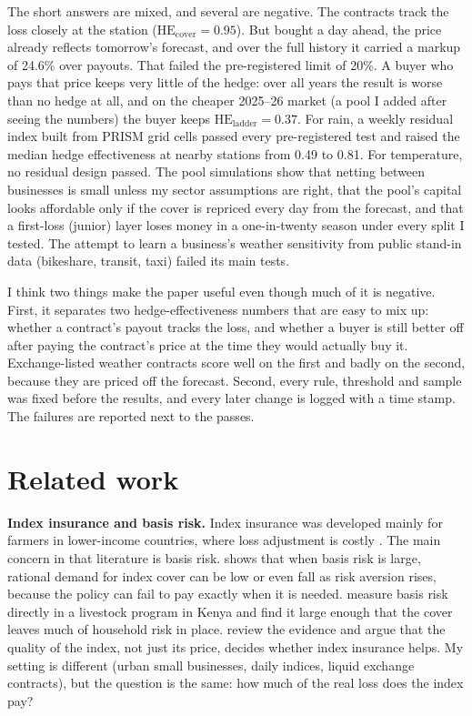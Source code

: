 \documentclass[11pt]{article}
\newcommand{\HEcov}{\mathrm{HE}_{\mathrm{cover}}}
\newcommand{\HElad}{\mathrm{HE}_{\mathrm{ladder}}}
\begin{document}
The short answers are mixed, and several are negative. The contracts track the loss closely at the station ($\HEcov = 0.95$). But bought a day ahead, the price already reflects tomorrow's forecast, and over the full history it carried a markup of 24.6\% over payouts. That failed the pre-registered limit of 20\%. A buyer who pays that price keeps very little of the hedge: over all years the result is worse than no hedge at all, and on the cheaper 2025--26 market (a pool I added after seeing the numbers) the buyer keeps $\HElad = 0.37$. For rain, a weekly residual index built from PRISM grid cells passed every pre-registered test and raised the median hedge effectiveness at nearby stations from 0.49 to 0.81. For temperature, no residual design passed. The pool simulations show that netting between businesses is small unless my sector assumptions are right, that the pool's capital looks affordable only if the cover is repriced every day from the forecast, and that a first-loss (junior) layer loses money in a one-in-twenty season under every split I tested. The attempt to learn a business's weather sensitivity from public stand-in data (bikeshare, transit, taxi) failed its main tests.

I think two things make the paper useful even though much of it is negative. First, it separates two hedge-effectiveness numbers that are easy to mix up: whether a contract's payout tracks the loss, and whether a buyer is still better off after paying the contract's price at the time they would actually buy it. Exchange-listed weather contracts score well on the first and badly on the second, because they are priced off the forecast. Second, every rule, threshold and sample was fixed before the results, and every later change is logged with a time stamp. The failures are reported next to the passes.

\section{Related work}
\label{sec:related}

\textbf{Index insurance and basis risk.} Index insurance was developed mainly for farmers in lower-income countries, where loss adjustment is costly \citep{barnett2007}. The main concern in that literature is basis risk. \citet{clarke2016} shows that when basis risk is large, rational demand for index cover can be low or even fall as risk aversion rises, because the policy can fail to pay exactly when it is needed. \citet{jensen2016} measure basis risk directly in a livestock program in Kenya and find it large enough that the cover leaves much of household risk in place. \citet{carter2017} review the evidence and argue that the quality of the index, not just its price, decides whether index insurance helps. My setting is different (urban small businesses, daily indices, liquid exchange contracts), but the question is the same: how much of the real loss does the index pay?
\end{document}
